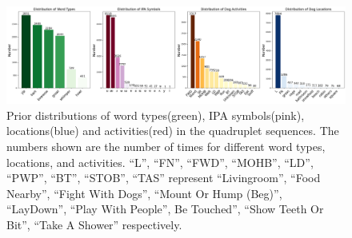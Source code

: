 
\begin{figure}[h]
\centering
\includegraphics[width=1.8\columnwidth]{images/data_distri.png}
\caption{Prior distributions of word types(green), IPA symbols(pink), locations(blue) and activities(red) in
the quadruplet sequences. The numbers shown are the number of times for different word types, locations, and activities.
``L'', ``FN'', ``FWD'', ``MOHB'', ``LD'', ``PWP'', ``BT'', ``STOB'', ``TAS'' represent  ``Livingroom'', ``Food Nearby'', ``Fight With Dogs'', ``Mount Or Hump (Beg)'', ``LayDown'', ``Play With People'', Be Touched'', ``Show Teeth Or Bit'', ``Take A Shower'' respectively. 
}
\label{fig:distri}
\end{figure}

